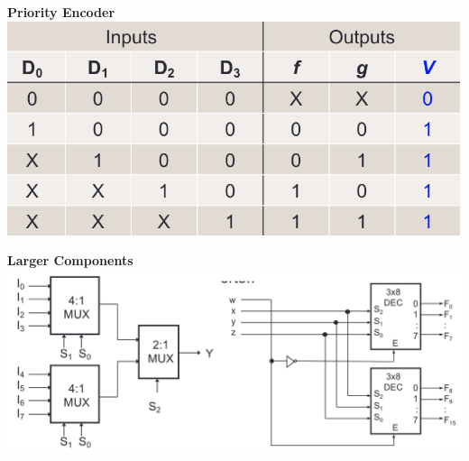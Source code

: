 \documentclass[a4paper]{article} \usepackage[backend=biber, style=numeric, sorting=none]{biblatex}
\begin{document}
\begin{multicols*}{4}
\begin{multicols*}{2}
\textbf{{Priority Encoder}}
\vfill\null
\columnbreak
{\centering \includegraphics[scale=0.17]{priorityEncoder}}
\end{multicols*}

\begin{multicols*}{2}
\textbf{{Larger Components}}
\vfill\null
\columnbreak
{\centering \includegraphics[scale=0.15]{largerComponents}}
\end{multicols*}


\end{multicols*}
\end{document}
